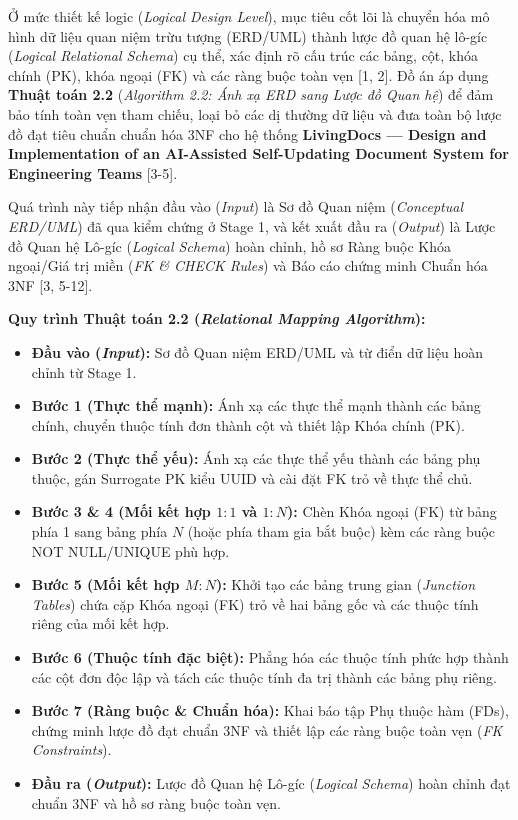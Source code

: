 Ở mức thiết kế logic (\textit{Logical Design Level}), mục tiêu cốt lõi là chuyển hóa mô hình dữ liệu quan niệm trừu tượng (ERD/UML) thành lược đồ quan hệ lô-gíc (\textit{Logical Relational Schema}) cụ thể, xác định rõ cấu trúc các bảng, cột, khóa chính (PK), khóa ngoại (FK) và các ràng buộc toàn vẹn [1, 2]. Đồ án áp dụng \textbf{Thuật toán 2.2} (\textit{Algorithm 2.2: Ánh xạ ERD sang Lược đồ Quan hệ}) để đảm bảo tính toàn vẹn tham chiếu, loại bỏ các dị thường dữ liệu và đưa toàn bộ lược đồ đạt tiêu chuẩn chuẩn hóa 3NF cho hệ thống \textbf{LivingDocs — Design and Implementation of an AI-Assisted Self-Updating Document System for Engineering Teams} [3-5].

Quá trình này tiếp nhận đầu vào (\textit{Input}) là Sơ đồ Quan niệm (\textit{Conceptual ERD/UML}) đã qua kiểm chứng ở Stage 1, và kết xuất đầu ra (\textit{Output}) là Lược đồ Quan hệ Lô-gíc (\textit{Logical Schema}) hoàn chỉnh, hồ sơ Ràng buộc Khóa ngoại/Giá trị miền (\textit{FK \& CHECK Rules}) và Báo cáo chứng minh Chuẩn hóa 3NF [3, 5-12].

\textbf{Quy trình Thuật toán 2.2 (\textit{Relational Mapping Algorithm}):}
\begin{itemize}
    \item \textbf{Đầu vào (\textit{Input}):} Sơ đồ Quan niệm ERD/UML và từ điển dữ liệu hoàn chỉnh từ Stage 1.
    \item \textbf{Bước 1 (Thực thể mạnh):} Ánh xạ các thực thể mạnh thành các bảng chính, chuyển thuộc tính đơn thành cột và thiết lập Khóa chính (PK).
    \item \textbf{Bước 2 (Thực thể yếu):} Ánh xạ các thực thể yếu thành các bảng phụ thuộc, gán Surrogate PK kiểu UUID và cài đặt FK trỏ về thực thể chủ.
    \item \textbf{Bước 3 \& 4 (Mối kết hợp $1:1$ và $1:N$):} Chèn Khóa ngoại (FK) từ bảng phía 1 sang bảng phía $N$ (hoặc phía tham gia bắt buộc) kèm các ràng buộc NOT NULL/UNIQUE phù hợp.
    \item \textbf{Bước 5 (Mối kết hợp $M:N$):} Khởi tạo các bảng trung gian (\textit{Junction Tables}) chứa cặp Khóa ngoại (FK) trỏ về hai bảng gốc và các thuộc tính riêng của mối kết hợp.
    \item \textbf{Bước 6 (Thuộc tính đặc biệt):} Phẳng hóa các thuộc tính phức hợp thành các cột đơn độc lập và tách các thuộc tính đa trị thành các bảng phụ riêng.
    \item \textbf{Bước 7 (Ràng buộc \& Chuẩn hóa):} Khai báo tập Phụ thuộc hàm (FDs), chứng minh lược đồ đạt chuẩn 3NF và thiết lập các ràng buộc toàn vẹn (\textit{FK Constraints}).
    \item \textbf{Đầu ra (\textit{Output}):} Lược đồ Quan hệ Lô-gíc (\textit{Logical Schema}) hoàn chỉnh đạt chuẩn 3NF và hồ sơ ràng buộc toàn vẹn.
\end{itemize}

